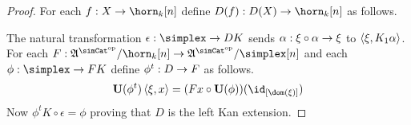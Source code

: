 \begin{proof} For each $f\of X\to\horn_k[n]$ define $D(f)\of D(X)\to\horn_k[n]$ as follows.

The natural transformation $\epsilon\of \simplex \to DK$ sends $\alpha: \xi\circ \alpha \to \xi$ to $\left\langle \xi,K_1\alpha \right\rangle$.
For each $F\of \ambient\s/\horn_k[n]\to\ambient\s/\simplex[n]$ and each $\phi\of \simplex\to FK$ define $\phi^t: D\to F$ as follows.
\[ \base(\phi^t)\tuplet{\xi,x} = (Fx\circ\base(\phi))(\id_{[\dom(\xi)]}) \]
Now $\phi^t K\circ \epsilon = \phi$ proving that $D$ is the left Kan extension.
\end{proof}
